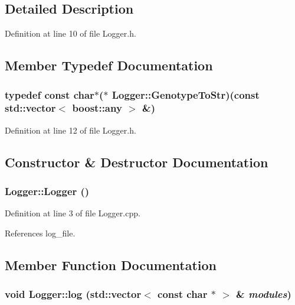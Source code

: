 \subsection{Detailed Description}


Definition at line 10 of file Logger.h.

\subsection{Member Typedef Documentation}
\hypertarget{classLogger_3c460ae4390c61502216746ae9e78830}{
\subsubsection{\setlength{\rightskip}{0pt plus 5cm}typedef const char$\ast$($\ast$ {\bf Logger::GenotypeToStr})(const std::vector$<$ boost::any $>$ \&)}}
\label{classLogger_3c460ae4390c61502216746ae9e78830}




Definition at line 12 of file Logger.h.

\subsection{Constructor \& Destructor Documentation}
\hypertarget{classLogger_bc41bfb031d896170c7675fa96a6b30c}{
\subsubsection{\setlength{\rightskip}{0pt plus 5cm}Logger::Logger ()}}
\label{classLogger_bc41bfb031d896170c7675fa96a6b30c}




Definition at line 3 of file Logger.cpp.

References log\_\-file.

\subsection{Member Function Documentation}
\hypertarget{classLogger_cc5ac6b4ebecd839887041f08639151d}{
\subsubsection{\setlength{\rightskip}{0pt plus 5cm}void Logger::log (std::vector$<$ const char $\ast$ $>$ \& {\em modules})}}
\label{classLogger_cc5ac6b4ebecd839887041f08639151d}





